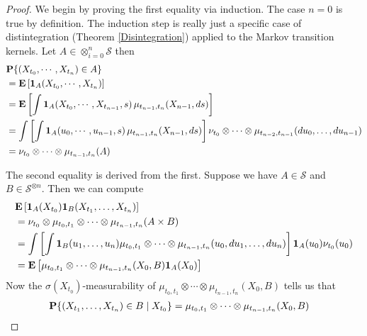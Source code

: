 \begin{proof}
We begin by proving the first equality via induction.  The case $n=0$
is true by definition.  The induction step is 
really just a specific case of distintegration (Theorem 
\ref{Disintegration}) applied to the Markov transition kernels.  Let $A
\in \otimes_{i=0}^n \mathcal{S}$ then 
\begin{align*}
&\probability{(X_{t_0}, \cdots, X_{t_n}) \in A} \\
&=\expectation{\characteristic{A}(X_{t_0}, \cdots, X_{t_n})} \\
&=\expectation{\int \characteristic{A}(X_{t_0}, \cdots, X_{t_{n-1}},s)
  \, \mu_{t_{n-1}, t_n} (X_{n-1}, ds)} \\
&=\int \left [ \int \characteristic{A}(u_0, \cdots,u_{n-1}, s)   \,
  \mu_{t_{n-1}, t_n} (X_{n-1}, ds) \right ] \nu_{t_0} \otimes \cdots \otimes
  \mu_{t_{n-2}, t_{n-1}}(du_0, \dotsc, du_{n-1})\\
&=\nu_{t_0} \otimes \cdots \otimes  \mu_{t_{n-1}, t_{n}}(A)
\end{align*}

The second equality is derived from the first.  Suppose we have $A \in
\mathcal{S}$ and $B \in \mathcal{S}^{\otimes n}$.  Then we can compute
\begin{align*}
&\expectation{\characteristic{A}(X_{t_0}) \characteristic{B}(X_{t_1},
  \dotsc, X_{t_n})}  \\
&= \nu_{t_0} \otimes \mu_{t_0, t_1} \otimes \cdots \otimes  \mu_{t_{n-1},
  t_{n}}(A \times B) \\
&= \int \left [ \int \characteristic{B}(u_1, \dotsc, u_n) \mu_{t_0,
    t_1} \otimes \cdots \otimes \mu_{t_{n-1}, t_n} (u_0, du_1, \dotsc, du_n) \right ]
\characteristic{A}(u_0) \nu_{t_0}(u_0) \\
&=\expectation{\mu_{t_0, t_1} \otimes \cdots \otimes \mu_{t_{n-1},
    t_n}(X_0, B) \characteristic{A}(X_0)}
\end{align*}
Now the $\sigma(X_{t_0})$-measurability of $\mu_{t_0, t_1} \otimes \cdots \otimes \mu_{t_{n-1},
    t_n}(X_0, B)$ tells us that 
\begin{align*}
\cprobability{X_{t_0}}{(X_{t_1},\dotsc, X_{t_n}) \in B} 
&= \mu_{t_0, t_1} \otimes \cdots \otimes \mu_{t_{n-1},    t_n}(X_0, B)
\end{align*}


\end{proof}
